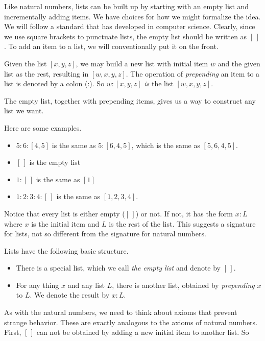 Like natural numbers, lists can be built up by starting with an empty list and incrementally adding items. We have choices 
for how we might formalize the idea. We will follow a standard that has developed in computer science. Clearly, since we use 
square brackets to punctuate lists, the empty list should be written as $[\,]$. To add an item to a list, we will conventionally
put it on the front.  

Given the list $[x,y,z]$, we may build a new list with initial item $w$ and the given list as the rest, resulting in $[w,x,y,z]$.
The operation of \emph{prepending} an item to a list is denoted by a colon (:). 
So $w:[x,y,z]$ \emph{is} the list $[w,x,y,z]$.

The empty list, together with prepending items, gives us a way to construct any list we want.

\ipadbreak

\begin{example}
  Here are some examples.
  \begin{itemize}
  \item $5:6:[4,5]$ is the same as $5:[6,4,5]$, which is the same as
    $[5,6,4,5]$.
  \item $[\,]$ is the empty list
  \item $1:[\,]$ is the same as $[1]$
  \item $1:2:3:4:[\,]$ is the same as $[1,2,3,4]$.
  \end{itemize}
\end{example}

Notice that every list is either empty ($[\,]$) or not. If not, it has
the form $x:L$ where $x$ is the initial item and $L$
is the rest of the list. This suggests a signature for lists, not so different from
the signature for natural numbers.

\begin{postulate}\label{post:ListSig}
	Lists have the following basic structure.
	  \begin{itemize}
	  \item There is a special list, which we call \emph{the empty list} and denote by $[\,]$.
	  \item For any thing $x$ and any list $L$, there is another list, obtained by \emph{prepending} $x$ to $L$. We denote
	  the result by $x:L$.
	  \end{itemize}
\end{postulate}

As with the natural numbers, we need to think about axioms that prevent strange behavior. These are exactly analogous to the
axioms of natural numbers. First, $[\,]$ can not be obtained by adding a new initial item to another list. So

